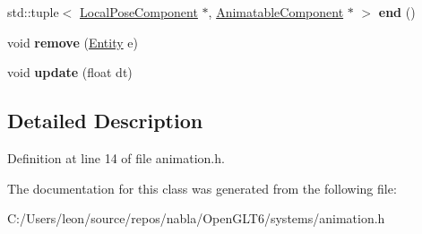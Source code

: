 \begin{DoxyCompactItemize}
std\+::tuple$<$ \mbox{\hyperlink{structnabla_1_1_local_pose_component}{Local\+Pose\+Component}} $\ast$, \mbox{\hyperlink{structnabla_1_1_animatable_component}{Animatable\+Component}} $\ast$ $>$ {\bfseries end} ()
\item 
\mbox{\label{classnabla_1_1_animation_system_a8cf322b787134b6ea6563adea102ea6d}} 
void {\bfseries remove} (\mbox{\hyperlink{structnabla_1_1_entity}{Entity}} e)
\item 
\mbox{\label{classnabla_1_1_animation_system_ac5231e59d5e026f305e574b0dc5e9d78}} 
void {\bfseries update} (float dt)
\end{DoxyCompactItemize}


\subsection{Detailed Description}


Definition at line 14 of file animation.\+h.



The documentation for this class was generated from the following file\+:\begin{DoxyCompactItemize}
\item 
C\+:/\+Users/leon/source/repos/nabla/\+Open\+G\+L\+T6/systems/animation.\+h\end{DoxyCompactItemize}
